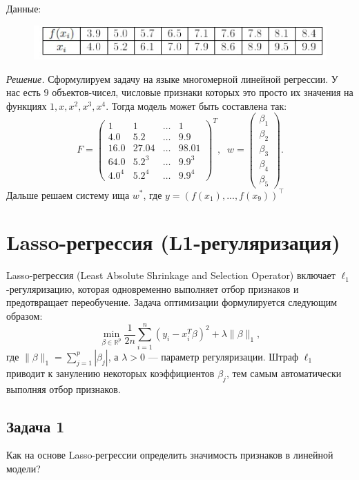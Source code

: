 Данные:
\begin{figure}[h]
  \centering
  \includegraphics[scale=0.7]{chapters/general_linear/pictures/tab.jpg}
\end{figure}

\noindent\textit{Решение.} Сформулируем задачу на языке многомерной линейной регрессии. У нас есть $9$ объектов-чисел, числовые признаки которых это просто их значения на функциях $1, x, x^2, x^3, x^4$. Тогда модель может быть составлена так:
$$F = \begin{pmatrix}
    1     & 1     & \dots & 1      \\
    4.0   & 5.2   & \dots & 9.9    \\
    16.0  & 27.04 & \dots & 98.01  \\
    64.0  & 5.2^3 & \dots & 9.9^3  \\
    4.0^4 & 5.2^4 & \dots & 9.9^4
  \end{pmatrix}^T, \;\; w = \begin{pmatrix}
    \beta_1 \\
    \beta_2 \\
    \beta_3 \\
    \beta_4 \\
    \beta_5
  \end{pmatrix}.$$
Дальше решаем систему ища $w^*$, где $y = (f(x_1), ..., f(x_9))^\top$

\section*{Lasso-регрессия (L1-регуляризация)}

Lasso-регрессия (Least Absolute Shrinkage and Selection Operator) включает $\ell_1$-регуляризацию, которая одновременно выполняет отбор признаков и предотвращает переобучение. Задача оптимизации формулируется следующим образом:
\[
  \min_{\beta \in \mathbb{R}^p} \frac{1}{2n} \sum_{i=1}^n (y_i - x_i^T \beta)^2 + \lambda \|\beta\|_1,
\]
где $\|\beta\|_1 = \sum_{j=1}^p |\beta_j|$, а $\lambda > 0$ — параметр регуляризации. Штраф $\ell_1$ приводит к занулению некоторых коэффициентов $\beta_j$, тем самым автоматически выполняя отбор признаков.

\subsection*{Задача 1}
Как на основе Lasso-регрессии определить значимость признаков в линейной модели? 

